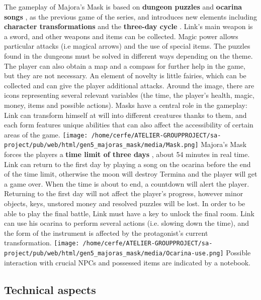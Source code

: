 \documentclass[a4paper,10pt]{book}
\begin{document}
          The gameplay of Majora's Mask is based on  \textbf{dungeon puzzles }  and  \textbf{ocarina songs } , as the previous game of the series, and introduces new elements including
           \textbf{character transformations }  and  the  \textbf{three-day cycle } .
          Link's main weapon is a sword, and other weapons and items can be collected. Magic power allows particular attacks (i.e magical arrows) and the use of special items.
          The puzzles found in the dungeons must be solved in different ways depending on the theme. 
          The player can also obtain a map and a compass for further help in the game, but they are not necessary. 
          An element of novelty is little fairies, which can be collected and can give the player
          additional attacks. 
          Around the image, there are icons representing several relevant variables (the time, the player's health, magic, money, items and possible actions). 
          Masks have a central role in the gameplay: Link can transform himself at will into different creatures thanks to them, and each form features unique abilities that can also affect the accessibility
          of certain areas of the game. 
 \texttt{[image: /home/cerfe/ATELIER-GROUPPROJECT/sa-project/pub/web/html/gen5\_majoras\_mask/media/Mask.png]}
          Majora's Mask forces the players a  \textbf{time limit of three days } , about 54 minutes in real time. Link can return to the first day by playing a song on the ocarina
          before the end of the time limit, otherwise the moon will destroy Termina and the player will get a game over. When the time is about to end, a countdown will alert the player. Returning to the first day
          will not affect the player's progress, however minor objects, keys, unstored money and resolved puzzles will be lost. In order to be able to play the final battle, Link must have a key to unlock the final room.
          Link can use his ocarina to perform several actions (i.e. slowing down the time), and the form of the instrument is affected by the protagonist's current transformation. 
 \texttt{[image: /home/cerfe/ATELIER-GROUPPROJECT/sa-project/pub/web/html/gen5\_majoras\_mask/media/Ocarina-use.png]}
          Possible interaction with crucial NPCs and possessed items are indicated by a notebook.
         \subsection{Technical aspects }
 
\end{document}
